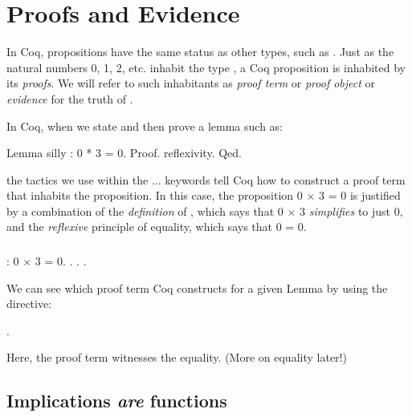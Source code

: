 \documentclass[12pt]{report}
\begin{document}
\section{Proofs and Evidence}



 In Coq, propositions have the same status as other types, such as
    .  Just as the natural numbers 0, 1, 2, etc. inhabit
    the type , a Coq proposition  is inhabited by its
    \textit{proofs}.  We will refer to such inhabitants as \textit{proof term} or
    \textit{proof object} or \textit{evidence} for the truth of . 


    In Coq, when we state and then prove a lemma such as:


Lemma silly : 0 * 3 = 0.  
Proof. reflexivity. Qed.


    the tactics we use within the ... keywords tell Coq
    how to construct a proof term that inhabits the proposition.  In
    this case, the proposition 0 \ensuremath{\times} 3 = 0 is justified by a
    combination of the \textit{definition} of , which says that 0 \ensuremath{\times} 3
    \textit{simplifies} to just 0, and the \textit{reflexive} principle of
    equality, which says that 0 = 0.




\subsubsection{ }

\begin{coqdoccode}
\coqdocemptyline
\coqdocnoindent
{}  : 0 \ensuremath{\times} 3 = 0.\coqdoceol
\coqdocnoindent
{}. . .\coqdoceol
\coqdocemptyline
\end{coqdoccode}
We can see which proof term Coq constructs for a given Lemma by
using the  directive: \begin{coqdoccode}
\coqdocemptyline
\coqdocnoindent
{} .\coqdoceol
\coqdocemptyline
\end{coqdoccode}
Here, the  proof term witnesses the equality. (More on
equality later!)

\subsection{Implications \textit{are} functions}
\end{document}

